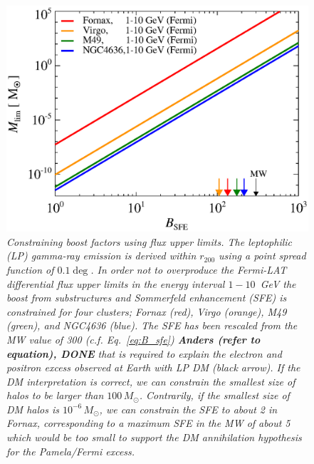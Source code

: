 \documentclass[10pt,aps,pra,reprint,amsmath,amsfonts,amssymb,showpacs,nofootinbib,floatfix]{revtex4-1}
\newcommand{\msun}{M_\odot}
\newcommand{\rvir}{r_{200}}
\begin{document}
\begin{figure}%
 \includegraphics[width=0.99\columnwidth]{figures/LP.const.diff.v11.0.1deg.1.6T.SubMass.SF300.IR2.noMW.woGal.eps}
 \caption{\it Constraining boost factors using flux upper limits. The
   leptophilic (LP) gamma-ray emission is derived within $\rvir$ using
   a point spread function of $0.1\deg$. In order not to overproduce
   the Fermi-LAT differential flux upper limits in the energy interval
   $1-10$~GeV the boost from substructures and Sommerfeld enhancement
   (SFE) is constrained for four clusters; Fornax (red), Virgo
   (orange), M49 (green), and NGC4636 (blue). The SFE has been
   rescaled from the MW value of 300 (c.f. Eq.~\ref{eq:B_sfe}) {\bf
     Anders (refer to equation), DONE} that is required to explain the
   electron and positron excess observed at Earth with LP DM (black
   arrow). If the DM interpretation is correct, we can constrain the
   smallest size of halos to be larger than $100\,\msun$. Contrarily,
   if the smallest size of DM halos is $10^{-6}\,\msun$, we can
   constrain the SFE to about 2 in Fornax, corresponding to a maximum
   SFE in the MW of about 5 which would be too small to support the DM
   annihilation hypothesis for the Pamela/Fermi excess.}
 \label{fig:boost_const}
\end{figure}
\end{document}
